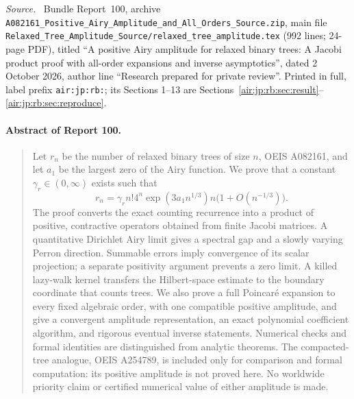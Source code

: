\documentclass[11pt,letterpaper]{article}
\numberwithin{equation}{section}
\theoremstyle{remark}
\newenvironment{partsource}{\par\medskip\noindent\begin{minipage}{\linewidth}\small\raggedright\textit{Source.}\ }{\end{minipage}\par\medskip}
\newcommand{\repopath}[1]{\nolinkurl{#1}}
\begin{document}
\bigskip{}\par\nopagebreak
\begin{partsource}
Bundle Report~100, archive \repopath{A082161_Positive_Airy_Amplitude_and_All_Orders_Source.zip}, main file \repopath{Relaxed_Tree_Amplitude_Source/relaxed_tree_amplitude.tex} (992 lines; 24-page PDF), titled ``A positive Airy amplitude for relaxed binary trees: A Jacobi product proof with all-order expansions and inverse asymptotics'', dated 2 October 2026, author line ``Research prepared for private review''. Printed in full, label prefix \texttt{air:jp:rb:}; its Sections 1--13 are Sections~\ref{air:jp:rb:sec:result}--\ref{air:jp:rb:sec:reproduce}.
\end{partsource}

\paragraph{Abstract of Report 100.}
\begin{quote}\small
Let $r_n$ be the number of relaxed binary trees of size $n$, OEIS A082161, and let $a_1$ be the largest zero of the Airy function. We prove that a constant $\gamma_r\in(0,\infty)$ exists such that
\[
 r_n=\gamma_r n!4^n\exp(3a_1n^{1/3})n\bigl(1+O(n^{-1/3})\bigr).
\]
The proof converts the exact counting recurrence into a product of positive, contractive operators obtained from finite Jacobi matrices. A quantitative Dirichlet Airy limit gives a spectral gap and a slowly varying Perron direction. Summable errors imply convergence of its scalar projection; a separate positivity argument prevents a zero limit. A killed lazy-walk kernel transfers the Hilbert-space estimate to the boundary coordinate that counts trees. We also prove a full Poincar\'e expansion to every fixed algebraic order, with one compatible positive amplitude, and give a convergent amplitude representation, an exact polynomial coefficient algorithm, and rigorous eventual inverse statements. Numerical checks and formal identities are distinguished from analytic theorems. The compacted-tree analogue, OEIS A254789, is included only for comparison and formal computation: its positive amplitude is not proved here. No worldwide priority claim or certified numerical value of either amplitude is made.
\end{quote}
\end{document}
